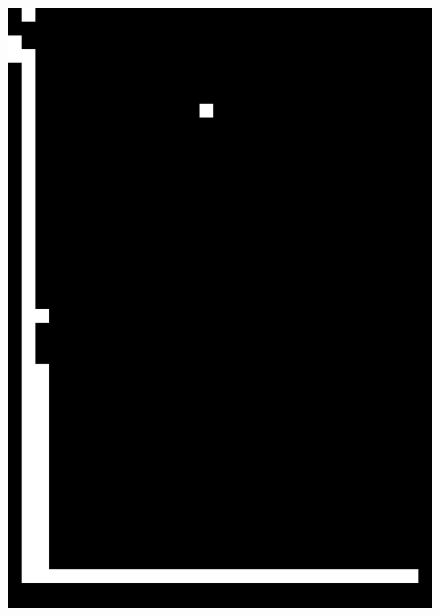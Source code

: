 \documentclass{book}
\begin{document}
\begin{figure}[H]
\begin{center}
\includegraphics[scale=0.06]{images/1g_seuil.jpg}

\end{center}
\end{figure}
\end{document}
